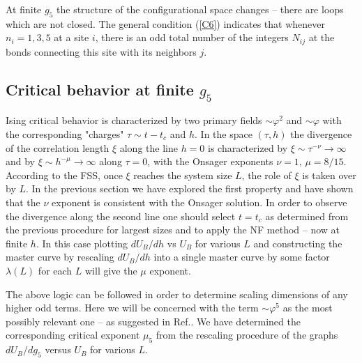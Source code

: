 \documentclass[prb,aps,twocolumn,groupedaddress,floats,showpacs,final]{revtex4}
\begin{document}
At finite $g_5$ the structure of the configurational space changes -- there are loops which are not closed. The general condition (\ref{C6}) indicates that whenever $n_i=1,3,5$ at a site $i$, there is an odd total number of the  integers $N_{ij}$ at the bonds connecting this site with its neighbors $j$.  



\subsection{Critical behavior at finite $g_5$}
Ising critical behavior is characterized by two primary fields $\sim \varphi^2$ and $\sim \varphi$ with the corresponding "charges" $\tau \sim t-t_c$ and $h$. In the space $(\tau,h)$ the divergence of the correlation length $\xi$ along the line $h=0$ is characterized by $\xi \sim \tau^{-\nu} \to \infty$ and by $\xi \sim h^{-\mu} \to \infty $ along $\tau=0$, with the Onsager exponents $\nu=1,\, \mu=8/15$. According to the FSS, once $\xi$ reaches the system size $L$, the role of $\xi$ is taken over by $L$. In the previous section we have explored the first property and have shown that the $\nu$ exponent is consistent with the Onsager solution. In order to observe the divergence along the second line one should select $t= t_c  $ as determined from the previous procedure for largest sizes and to apply the NF method --  now at finite $h$. In this case plotting $dU_B/dh$ vs $U_B$ for various $L$ and constructing the master curve by rescaling $dU_B/dh$ into a single master curve by some factor $\lambda(L)$ for each $L$ will give the $\mu$ exponent. 

The above logic can be followed in order to determine scaling dimensions of any higher odd terms. Here we will be concerned with the term $\sim \varphi^5$ as the most possibly relevant one -- as suggested in Ref.\cite{Hertz}. We have determined the corresponding critical exponent $\mu_5$ from the rescaling procedure of the graphs $ dU_B/dg_5$ versus $U_B$ for various $L$.
\end{document}
